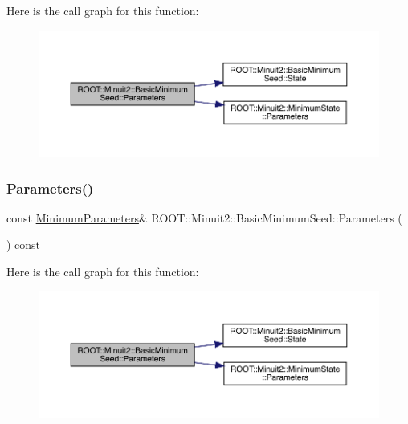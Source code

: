 Here is the call graph for this function\+:
\nopagebreak
\begin{figure}[H]
\begin{center}
\leavevmode
\includegraphics[width=350pt]{de/d50/classROOT_1_1Minuit2_1_1BasicMinimumSeed_a0aec3622cdc4f1c52a4be74f8b96059a_cgraph}
\end{center}
\end{figure}
\mbox{\label{classROOT_1_1Minuit2_1_1BasicMinimumSeed_a0aec3622cdc4f1c52a4be74f8b96059a}} 
\subsubsection{\texorpdfstring{Parameters()}{Parameters()}\hspace{0.1cm}{\footnotesize\ttfamily [2/3]}}
{\footnotesize\ttfamily const \mbox{\hyperlink{classROOT_1_1Minuit2_1_1MinimumParameters}{Minimum\+Parameters}}\& R\+O\+O\+T\+::\+Minuit2\+::\+Basic\+Minimum\+Seed\+::\+Parameters (\begin{DoxyParamCaption}{ }\end{DoxyParamCaption}) const\hspace{0.3cm}{\ttfamily [inline]}}

Here is the call graph for this function\+:
\nopagebreak
\begin{figure}[H]
\begin{center}
\leavevmode
\includegraphics[width=350pt]{de/d50/classROOT_1_1Minuit2_1_1BasicMinimumSeed_a0aec3622cdc4f1c52a4be74f8b96059a_cgraph}
\end{center}
\end{figure}
\mbox{\label{classROOT_1_1Minuit2_1_1BasicMinimumSeed_a0aec3622cdc4f1c52a4be74f8b96059a}} 
